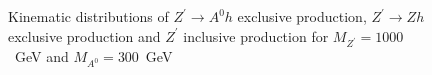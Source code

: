 \begin{figure}[h!]
{  	}
  	\hfill
  	\caption{Kinematic distributions of $Z^\prime \to A^0h$ exclusive production, $Z^\prime \to Zh$ exclusive production and $Z^\prime$ inclusive production for $M_{Z^\prime}=1000$~GeV and $M_{A^0}=300$~GeV}
  	\label{fig:DMH_zpincl}
\end{figure}

  
